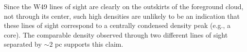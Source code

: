

Since the W49 lines of sight are clearly on the outskirts of the foreground cloud, not
through its center, such high densities are unlikely to be an indication that
these lines of sight correspond to a centrally condensed density peak (e.g., a
core).  The comparable density observed through two different lines of sight
separated by $\sim 2$ pc supports this claim.





